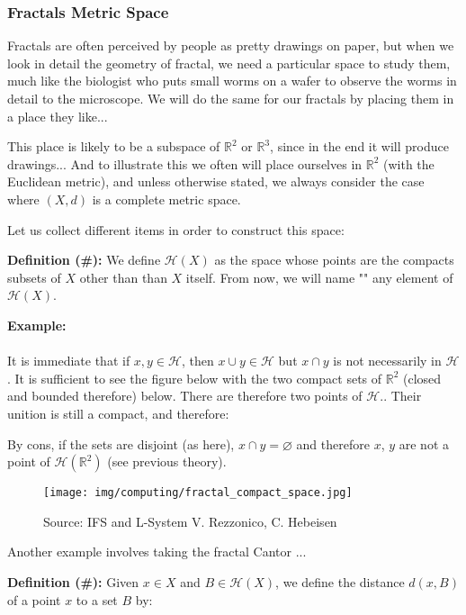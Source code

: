 	\subsubsection{Fractals Metric Space}
	Fractals are often perceived by people as pretty drawings on paper, but when we look in detail the geometry of fractal, we need a particular space to study them, much like the biologist who puts small worms on a wafer to observe the worms in detail to the microscope. We will do the same for our fractals by placing them in a place they like...
	
	This place is likely to be a subspace of $\mathbb{R}^2$ or  $\mathbb{R}^3$, since in the end it will produce drawings... And to illustrate this we often will place ourselves in  $\mathbb{R}^2$ (with the Euclidean metric), and unless otherwise stated, we always consider the case where $(X,d)$ is a complete metric space.
	
	Let us collect different items in order to construct this space:
	
	\textbf{Definition (\#\mydef):} We define $\mathcal{H}(X)$ as the space whose points are the compacts subsets of $X$ other than than $X$ itself. From now, we will name "" any element of $\mathcal{H}(X)$.
	
	\begin{tcolorbox}[colframe=black,colback=white,sharp corners]
	\textbf{{\Large {}}Example:}\\\\
	It is immediate that if $x,y\in\mathcal{H}$, then $x\cup y\in \mathcal{H}$ but $x\cap y$ is not necessarily in $\mathcal{H}$. It is sufficient to see the figure below with the two compact sets of $\mathbb{R}^2$ (closed and bounded therefore) below. There are therefore two points of $\mathcal{H}$.. Their unition is still a compact, and therefore:
	

	By cons, if the sets are disjoint (as here), $x\cap y=\varnothing$ and therefore $x$, $y$ are not a point of $\mathcal{H}(\mathbb{R}^2)$ (see previous theory).
	\begin{figure}[H]
		\centering
		\texttt{[image: img/computing/fractal\_compact\_space.jpg]}
		\caption{Source: IFS and L-System V. Rezzonico, C. Hebeisen}
	\end{figure}
	\end{tcolorbox}
	Another example involves taking the fractal Cantor ...
	
	\textbf{Definition (\#\mydef):} Given $x\in X$ and $B\in\mathcal{H}(X)$, we define the distance $d(x,B)$ of a point $x$ to a set $B$  by:
	
